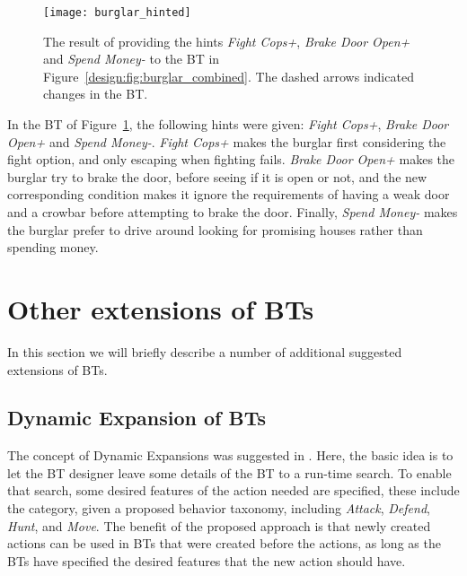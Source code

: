 \begin{figure}[h!]
\centering
  \texttt{[image: burglar\_hinted]}
\caption{The result of providing the hints \emph{Fight Cops+},  \emph{Brake Door Open+} and  \emph{Spend Money-} to the BT in Figure~\ref{design:fig:burglar_combined}. The dashed arrows indicated changes in the BT.}
\label{design:fig:burglar_hinted}
\end{figure}

In the BT of Figure~\ref{design:fig:burglar_hinted}, the following hints were given: \emph{Fight Cops+},  \emph{Brake Door Open+} and  \emph{Spend Money-}.
\emph{Fight Cops+} makes the burglar first considering the fight option, and only escaping when fighting fails.
 \emph{Brake Door Open+} makes the burglar try to brake the door, before seeing if it is open or not,
 and the new corresponding condition makes it ignore the requirements of having a weak door and a crowbar before attempting to brake the door.
Finally,   \emph{Spend Money-} makes the burglar prefer to drive around looking for promising houses rather than spending money.


\section{Other extensions of BTs}
In this section we will briefly describe a number of additional suggested extensions of BTs.
\subsection{Dynamic Expansion of BTs}
The concept of Dynamic Expansions was suggested in \cite{florez2008dynamic}.
Here, the basic idea is to let the BT designer leave some details of the BT to a run-time search.
To enable that search, some desired features of the action needed are specified, these include the
category, given a proposed behavior taxonomy, including \emph{Attack}, \emph{Defend}, \emph{Hunt}, and \emph{Move}. 
The benefit of the proposed approach is that newly created actions can be used in BTs that were created before the actions, 
as long as the BTs have specified the desired features that the new action should have.




